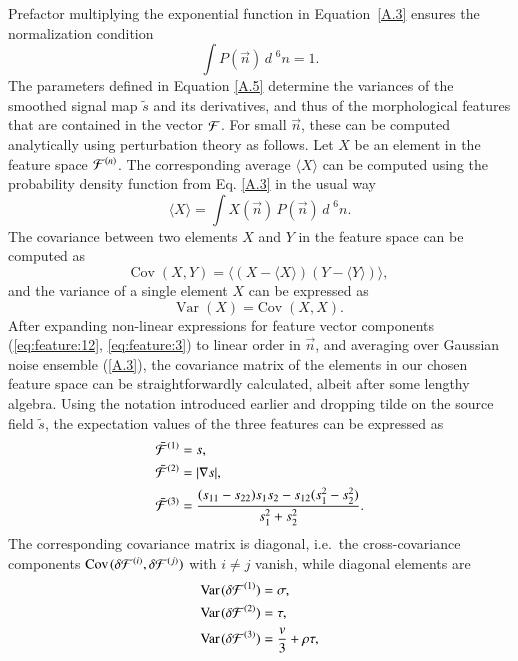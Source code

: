 \documentclass{aa}
\newcommand{\var}[1]{{\textrm{Var}\;\!(#1)}}
\newcommand{\cov}[1]{{\textrm{Cov}\;\!(#1)}}
\newcommand{\ev}[1]{\langle{#1}\rangle}
\begin{document}
%
Prefactor multiplying the exponential function in Equation~\eqref{A.3} ensures the normalization condition
%
\begin{equation}
  \int P(\vec{n})\, {d\;\!}^6n = 1 .
\end{equation}
%
The parameters defined in Equation \eqref{A.5} determine the variances of the smoothed signal map $\tilde{s}$ and its derivatives, and thus of the morphological features that are contained in the vector ${\cal F}$. For small $\vec{n}$, these can be computed analytically using perturbation theory as follows. Let $X$ be an element in the feature space ${{\cal F}^{(n)}}$. The corresponding average $\ev{X}$ can be computed using the probability density function from Eq. \eqref{A.3} in the usual way
%
\begin{equation}
  \ev{X} = \int X(\vec{n})\, P(\vec{n})\, {d\;\!}^6n .
\end{equation}
%
The covariance between two elements $X$ and $Y$ in the feature space can be computed as
%
\begin{equation}
    \cov{X,Y}=\ev{(X-\ev{X})(Y-\ev{Y})} ,
\end{equation}
%
and the variance of a single element $X$ can be expressed as
%
\begin{equation}
    \var{X}=\cov{X,X} .
\end{equation}
%
After expanding non-linear expressions for feature vector components (\ref{eq:feature:12}, \ref{eq:feature:3}) to linear order in $\vec{n}$, and averaging over Gaussian noise ensemble (\ref{A.3}), the covariance matrix of the elements in our chosen feature space can be straightforwardly calculated, albeit after some lengthy algebra. Using the notation introduced earlier and dropping tilde on the source field $\tilde{s}$, the expectation values of the three features can be expressed as
%
\begin{equation}
\begin{aligned}
&\bar{\cal F}^{(1)} = s,\\
&\bar{\cal F}^{(2)} = |\nabla s|,\\
&\bar{\cal F}^{(3)} = \frac{(s_{11}-s_{22}) s_1 s_2 - s_{12}(s_1^2 - s_2^2)}{s_1^2 + s_2^2}.
\end{aligned}
\end{equation}
%
The corresponding covariance matrix is diagonal, i.e.\ the cross-covariance components $\cov{\delta{\cal F}^{(i)},\delta{\cal F}^{(j)}}$ with $i\ne j$ vanish, while diagonal elements are
%
\begin{equation}
\begin{aligned}
&\var{\delta{\cal F}^{(1)}} = \sigma,\\
&\var{\delta{\cal F}^{(2)}} = \tau,\\
&\var{\delta{\cal F}^{(3)}} = \frac{v}{3} + \rho\tau,
\end{aligned}
\end{equation}
\end{document}
